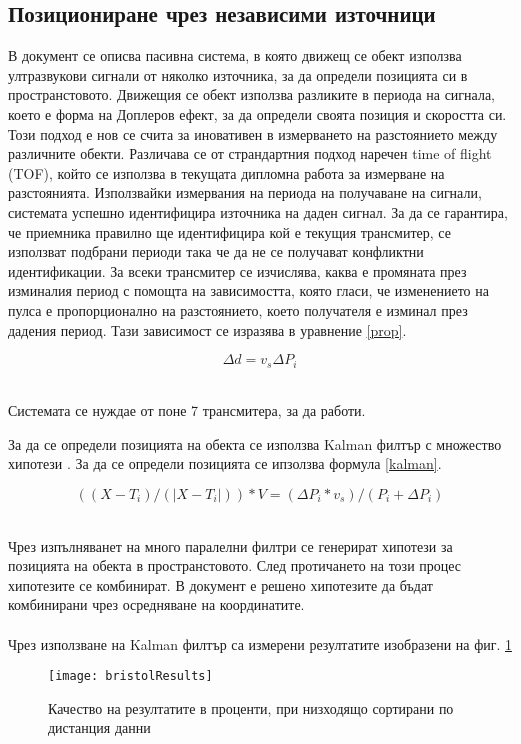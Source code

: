 \subsection{Позициониране чрез независими източници}

В документ \cite{bristolBeacons} се описва пасивна система, в която движещ се обект използва ултразвукови сигнали от няколко източника, за да определи позицията си в пространстовото. Движещия се обект използва разликите в периода на сигнала, което е форма на Доплеров ефект, за да определи своята позиция и скоростта си. Този подход е нов се счита за иновативен в измерването на разстоянието между различните обекти. Различава се от страндартния подход наречен time of flight (TOF), който се използва в текущата дипломна работа за измерване на разстоянията. Използвайки измервания на периода на получаване на сигнали, системата успешно идентифицира източника на даден сигнал. За да се гарантира, че приемника правилно ще идентифицира кой е текущия трансмитер, се използват подбрани периоди така че да не се получават конфликтни идентификации. За всеки трансмитер се изчислява, каква е промяната през изминалия период с помощта на зависимостта, която гласи, че изменението на пулса е пропорционално на разстоянието, което получателя е изминал през дадения период. Тази зависимост се изразява в уравнение \ref{prop}.

\centerline{\begin{equation} \label{prop}
    \Delta d = v_s \Delta P_i
\end{equation}} \\

Системата се нуждае от поне 7 трансмитера, за да работи. 

За да се определи позицията на обекта се използва Kalman филтър с множество хипотези \cite{kalmanFilter}. За да се определи позицията се ипзолзва формула \ref{kalman}.

\centerline{\begin{equation} \label{kalman}
    ((X-T_i)/ (|X-T_i|)) * V = (\Delta P_i * v_s) / (P_i + \Delta P_i)
\end{equation}}\\

Чрез изпълняванет на много паралелни филтри се генерират хипотези за позицията на обекта в пространстовото. След протичането на този процес хипотезите се комбинират. В документ \cite{bristolBeacons} е решено хипотезите да бъдат комбинирани чрез осредняване на координатите. \\


 \\
Чрез използване на Kalman филтър са измерени резултатите изобразени на фиг. \ref{fig:bristolResults}

\begin{figure}
    \centering
    \centerline{\texttt{[image: bristolResults]}}
    \caption{Качество на резултатите в проценти, при низходящо сортирани по дистанция данни}
    \label{fig:bristolResults}
\end{figure}